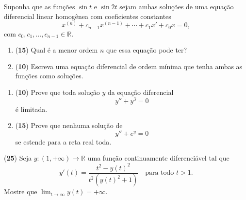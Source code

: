 \documentclass[10pt,a4paper]{amsart}
\newcommand{\R}{\mathbb{R}}
\begin{document}
 Suponha que as funções $\sin t$ e $\sin 2t$ sejam ambas soluções de uma equação diferencial linear homogênea com coeficientes constantes
\[
    x^{(n)} + c_{n-1} x^{(n-1)} + \cdots + c_1 x' + c_0 x = 0,
\]
com $c_0, c_1, \ldots, c_{n-1} \in \R$.
\begin{enumerate}[label=(\alph*)]
    \item ({\bf 15}) Qual é a menor ordem $n$ que essa equação pode ter?
    \item ({\bf 10}) Escreva uma equação diferencial de ordem mínima que tenha ambas as funções como soluções.
\end{enumerate}

\vspace{5mm}


\begin{enumerate}
[label=(\alph*)]

\item ({\bf 10}) Prove que toda solução $y$ da equação diferencial
    \[
    y'' + y^3 = 0
    \]
    é limitada. 

    \item ({\bf 15}) Prove que nenhuma solução de 
    \[
    y'' + e^{y} = 0
    \]
    se estende para a reta real toda. 

    \end{enumerate}

\vspace{5mm}

 ({\bf 25})  Seja $y:(1,+\infty) \to \mathbb{R}$ uma função continuamente diferenciável tal que 
\[
y'(t) = \frac{t^2 - y(t)^2}{t^2(y(t)^2 + 1)} \quad \text{para todo } t > 1. 
\]
Mostre que $\lim_{t \to \infty} y(t) = + \infty.$
\end{document}
